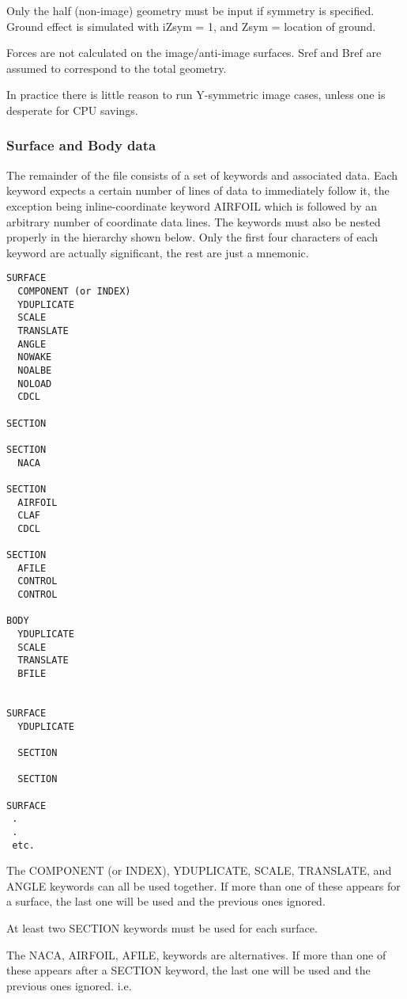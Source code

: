 Only the half (non-image) geometry must be input if symmetry is specified.
Ground effect is simulated with iZsym = 1, and Zsym = location of ground.

Forces are not calculated on the image/anti-image surfaces. 
Sref and Bref are assumed to correspond to the total geometry.

In practice there is little reason to run Y-symmetric image cases,
unless one is desperate for CPU savings.



\subsubsection{Surface and Body data}
The remainder of the file consists of a set of keywords and associated data.  
Each keyword expects a certain number of lines of data to immediately follow 
it, the exception being inline-coordinate keyword AIRFOIL which is followed
by an arbitrary number of coordinate data lines.  The keywords must also be 
nested properly in the hierarchy shown below.  Only the first four characters 
of each keyword are actually significant, the rest are just a mnemonic.
\begin{lstlisting}
SURFACE
  COMPONENT (or INDEX)
  YDUPLICATE
  SCALE
  TRANSLATE
  ANGLE
  NOWAKE
  NOALBE
  NOLOAD
  CDCL

SECTION

SECTION
  NACA

SECTION
  AIRFOIL
  CLAF
  CDCL

SECTION
  AFILE
  CONTROL
  CONTROL

BODY
  YDUPLICATE
  SCALE
  TRANSLATE
  BFILE


SURFACE
  YDUPLICATE
  
  SECTION
  
  SECTION

SURFACE
 .
 .
 etc.
\end{lstlisting}

The COMPONENT (or INDEX), YDUPLICATE, SCALE, TRANSLATE, and ANGLE keywords 
can all be used together.  If more than one of these appears for 
a surface, the last one will be used and the previous ones ignored.

At least two SECTION keywords must be used for each surface. 

The NACA, AIRFOIL, AFILE, keywords are alternatives.  
If more than one of these appears after a SECTION keyword, 
the last one will be used and the previous ones ignored.  i.e.

